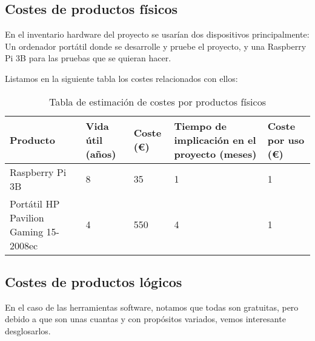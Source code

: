 \subsection {Costes de productos físicos}
En el inventario hardware del proyecto se usarían dos dispositivos principalmente: Un ordenador portátil donde se desarrolle y pruebe el proyecto, y una Raspberry Pi 3B para las pruebas que se quieran hacer.

Listamos en la siguiente tabla los costes relacionados con ellos:

\begin{center}
	\begin{table}[H]
		\centering
		\begin{tabularx}{\textwidth}{|X|X|X|X|X|}
			\hline
			\cellcolor{lightblue}\textbf{Producto} & 
			\cellcolor{lightblue}\textbf{Vida útil (años)} &  \cellcolor{lightblue}\textbf{Coste (€)} &
			\cellcolor{lightblue}\textbf{Tiempo de implicación en el proyecto (meses)} &
			\cellcolor{lightblue}\textbf{Coste por uso (€)} \\
			\hline
			Raspberry Pi 3B & 8 & 35 & 1 & 1\\
			\hline
			Portátil HP Pavilion Gaming 15-2008ec & 4 & 550 & 4 & 1\\
			\hline
		\end{tabularx}
		\caption{Tabla de estimación de costes por productos físicos}
	\end{table}
\end{center}

\subsection{Costes de productos lógicos}
En el caso de las herramientas software, notamos que todas son gratuitas, pero debido a que son unas cuantas y con propósitos variados, vemos interesante desglosarlos.

